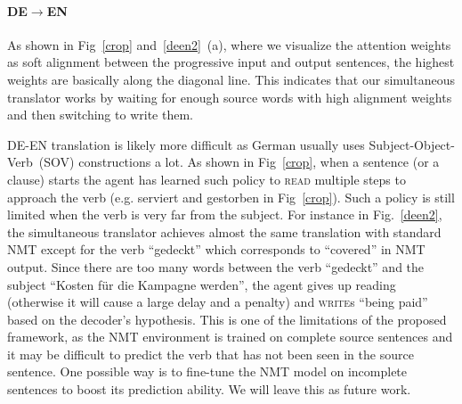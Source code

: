 

\paragraph{DE$\rightarrow$EN} 
As shown in Fig~\ref{crop} and~\ref{deen2}~(a), where we visualize the attention weights as soft alignment between the progressive input and output sentences, the highest weights are basically along the diagonal line. This indicates that our simultaneous translator works by waiting for enough source words with high alignment weights and then switching to write them. 

DE-EN translation is likely more difficult as German usually uses Subject-Object-Verb~(SOV) constructions a lot. %
As shown in Fig~\ref{crop},
when a sentence (or a clause) starts the agent has learned such policy to \textsc{read} multiple steps to approach the verb (e.g. serviert and gestorben in Fig~\ref{crop}). Such a policy is still limited when the verb is very far from the subject. For instance in Fig.~\ref{deen2}, the simultaneous translator achieves almost the same translation with standard NMT except for the verb ``gedeckt'' which corresponds to ``covered'' in NMT output. Since there are too many words between the verb ``gedeckt'' and the subject ``Kosten f\"{u}r die Kampagne werden'', the agent gives up reading (otherwise it will cause a large delay and a penalty) and \textsc{write}s ``being paid'' based on the decoder's hypothesis. This is one of the limitations of the proposed framework, as the NMT environment is trained on complete source sentences and it may be difficult to predict the verb that has not been seen in the source sentence. 
One possible way is to fine-tune the NMT model on incomplete sentences to boost its prediction ability. We will leave this as future work.

